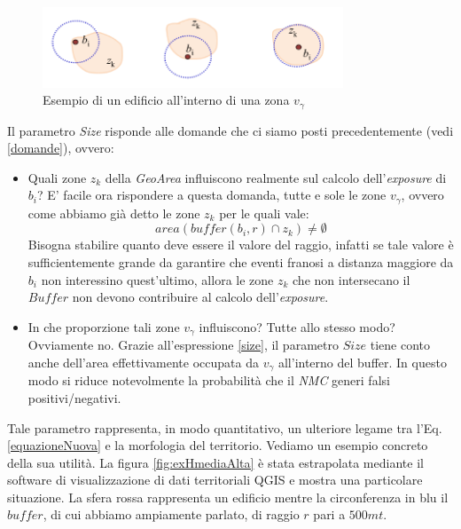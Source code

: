 \begin{figure}[bth]
  \label{fig:exBuffer}
   \centering
    \includegraphics[width=0.8\textwidth]{img/exBuffer}
     \caption{Esempio di un edificio all'interno di una zona $v_\gamma$}
      
\end{figure}
Il parametro \textit{Size} risponde alle domande che ci siamo posti precedentemente (vedi \ref{domande}), ovvero:
\begin{itemize}
\item Quali zone $z_k$ della \textit{GeoArea} influiscono realmente sul calcolo dell'\textit{exposure} di $b_i$? E' facile ora rispondere a questa domanda, tutte e sole le zone $v_\gamma$, ovvero come abbiamo già detto le zone $z_k$ per le quali vale:
\begin{equation}
\label{sizeNotZero}
   area (buffer (b_i,r) \cap z_k) \neq \emptyset
\end{equation}
Bisogna stabilire quanto deve essere il valore del raggio, infatti se tale valore è sufficientemente grande da garantire che eventi franosi a distanza maggiore da $b_i$ non interessino quest'ultimo, allora le zone $z_k$ che non intersecano il $Buffer$ non devono contribuire al calcolo dell'\textit{exposure}. \newline


\item In che proporzione tali zone $v_\gamma$ influiscono? Tutte allo stesso modo? Ovviamente no. Grazie all'espressione \ref{size}, il parametro $Size$ tiene conto anche dell'area effettivamente occupata da $v_\gamma$ all'interno del buffer. In questo modo si riduce notevolmente la probabilità che il \textit{NMC} generi falsi positivi/negativi. \newline 



\end{itemize}


Tale parametro rappresenta, in modo quantitativo, un ulteriore legame tra l'Eq.\ref{equazioneNuova} e la morfologia del territorio. Vediamo un esempio concreto della sua utilità. \newline
La figura \ref{fig:exHmediaAlta} è stata estrapolata mediante il software di visualizzazione di dati territoriali QGIS e mostra una particolare situazione.\newline
La sfera rossa rappresenta un edificio mentre la circonferenza in blu il $buffer$, di cui abbiamo ampiamente parlato, di raggio $r$ pari a $500mt$.

